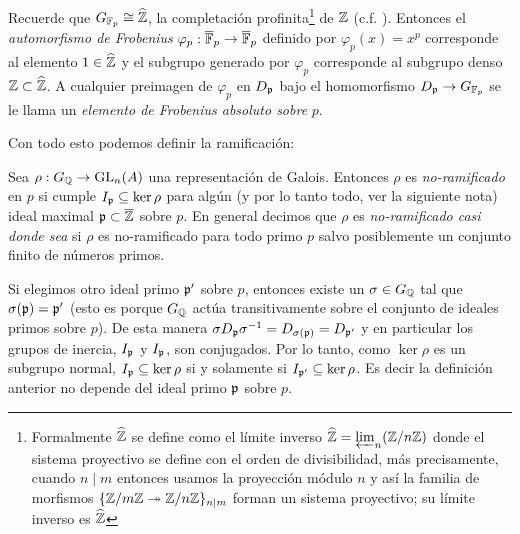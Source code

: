 Recuerde que $G_{\FF_p}\cong\what{\ZZ}$, la completaci\'on profinita\footnote[2]{Formalmente $\what{\ZZ}$ se define como el l\'imite inverso $\what{\ZZ}=\varprojlim_n (\ZZ/n\ZZ)$ donde el sistema proyectivo se define con el orden de divisibilidad, m\'as precisamente, cuando $n\mid m$ entonces usamos la proyecci\'on m\'odulo $n$ y as\'i la familia de morfismos $\{\mathbb{Z}/m\mathbb{Z}\twoheadrightarrow\mathbb{Z}/n\mathbb{Z}\}_{n\mid m}$ forman un sistema proyectivo; su l\'imite inverso es $\what{\ZZ}$} de $\mathbb{Z}$ (c.f. \cite[cap\'itulo IV, \S2, ejemplo 5]{NeukirchANT}). Entonces el \emph{automorfismo de Frobenius} $\varphi_p:\overline{\mathbb{F}}_p\rightarrow\overline{\mathbb{F}}_p$ definido por $\varphi_p(x)=x^p$ corresponde al elemento $1\in\what{\ZZ}$ y el subgrupo generado por $\varphi_p$ corresponde al subgrupo denso $\ZZ\subset\what{\ZZ}$. A cualquier preimagen de $\varphi_p$ en $D_{\mathfrak{p}}$ bajo el homomorfismo $D_{\mathfrak{p}}\rightarrow G_{\mathbb{F}_p}$ se le llama un \emph{elemento de Frobenius absoluto sobre} $p$.

Con todo esto podemos definir la ramificaci\'on:

\begin{defin}
  Sea $\rho:G_{\mathbb{Q}}\rightarrow\mathrm{GL}_n(A)$ una representaci\'on de Galois. Entonces $\rho$ es \emph{no-ramificado} en $p$ si cumple $I_{\mathfrak{p}}\subseteq\ker\rho$ para alg\'un (y por lo tanto todo, ver la siguiente nota) ideal maximal $\mathfrak{p}\subset\overline{\mathbb{Z}}$ sobre $p$. En general decimos que $\rho$ es \emph{no-ramificado casi donde sea} si $\rho$ es no-ramificado para todo primo $p$ salvo posiblemente un conjunto finito de n\'umeros primos.
\end{defin}

\begin{nota}
  Si elegimos otro ideal primo $\mathfrak{p}'$ sobre $p$, entonces existe un $\sigma\in G_{\mathbb{Q}}$ tal que $\sigma(\mathfrak{p})=\mathfrak{p}'$ (esto es porque $G_{\mathbb{Q}}$ act\'ua transitivamente sobre el conjunto de ideales primos sobre $p$). De esta manera $\sigma D_{\mathfrak{p}}\sigma^{-1}=D_{\sigma(\mathfrak{p})}=D_{\mathfrak{p}'}$ y en particular los grupos de inercia, $I_{\mathfrak{p}}$ y $I_{\mathfrak{p}}$, son conjugados. Por lo tanto, como $\ker\rho$ es un subgrupo normal, $I_{\mathfrak{p}}\subseteq\ker\rho$ si y solamente si $I_{\mathfrak{p}'}\subseteq\ker\rho$. Es decir la definici\'on anterior no depende del ideal primo $\mathfrak{p}$ sobre $p$.
\end{nota}

